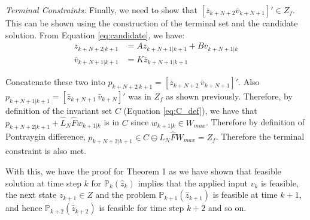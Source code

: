 \textit{Terminal Constraints:} Finally, we need to show that $[\bar{z}_{k+N+2} \bar{v}_{k+N+1}]' \in Z_f$. This can be shown using the construction of the terminal set and the candidate solution. From Equation \ref{eq:candidate}, we have:
\begin{subequations}
\begin{align}
\bar{z}_{k+N+2|k+1}&=A\bar{z}_{k+N+1|k+1} + B\bar{v}_{k+N+1|k} \\
\bar{v}_{k+N+1|k+1}&=K\bar{z}_{k+N+1|k+1}
\end{align}
\end{subequations}

Concatenate these two into $p_{k+N+2|k+1} = [\bar{z}_{k+N+2}\, \bar{v}_{k+N+1}]'$. Also $p_{k+N+1|k+1} = [\bar{z}_{k+N+1} \,\bar{v}_{k+N}]'$ was in $Z_f$ as shown previously. Therefore, by definition of the invariant set $C$ (Equation \ref{eq:C_def}), we have that $p_{k+N+2|k+1} + \hat{L}_N \hat{F} w_{k+1|k}$ is in $C$ since $w_{k+1|k}\in W_{max}$. Therefore by definition of Pontraygin difference, $p_{k+N+2|k+1} \in C \ominus \hat{L}_N\hat{F}W_{max} = Z_f$. Therefore the terminal constraint is also met.

With this, we have the proof for Theorem 1 as we have shown that feasible solution at time step $k$ for $\mathbb{P}_{k}(\hat{z}_{k}) $ implies that the applied input $v_k$ is feasible, the next state $z_{k+1} \in Z$ and the problem $\mathbb{P}_{k+1}(\hat{z}_{k+1}) $ is feasible at time $k+1$, and hence  $\mathbb{P}_{k+2}(\hat{z}_{k+2}) $ is feasible for time step $k+2$ and so on.






